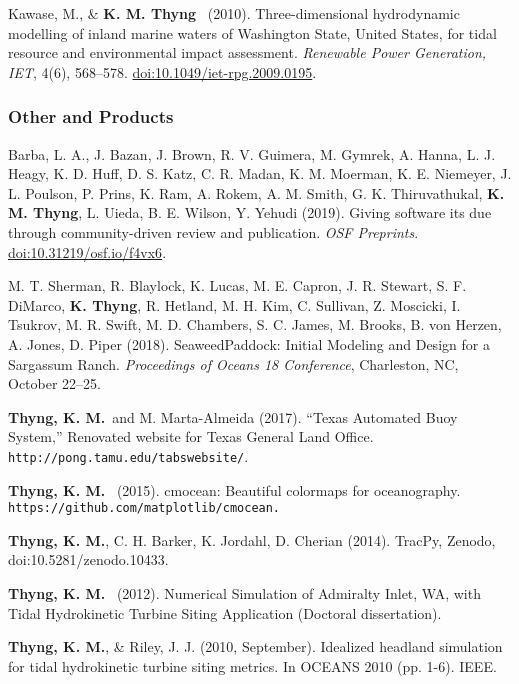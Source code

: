 \documentclass[10pt,letterpaper]{article}
\newcommand{\kmt}{\textbf{K. M. Thyng}}
\newcommand{\tkm}{\textbf{Thyng, K. M.}}
\newcommand{\kt}{\textbf{K. Thyng}}
\renewenvironment{itemize}{
  \begin{list}{}{
    \setlength{\leftmargin}{1.5em}
    \setlength{\itemsep}{0.25em}
    \setlength{\parskip}{0pt}
    \setlength{\parsep}{0.25em}
  }
}{
  \end{list}
}
\begin{document}
\begin{itemize}
\item Kawase, M., \& \kmt~ (2010). Three-dimensional hydrodynamic modelling of inland marine waters of Washington State, United States, for tidal resource and environmental impact assessment. \textit{Renewable Power Generation, IET}, 4(6), 568--578. \href{http://digital-library.theiet.org/content/journals/10.1049/iet-rpg.2009.0195}{doi:10.1049/iet-rpg.2009.0195}.

\end{itemize}

\subsubsection*{Other and Products}

\begin{itemize}

\item Barba, L. A., J. Bazan, J. Brown, R. V. Guimera, M. Gymrek, A. Hanna, L. J. Heagy, K. D. Huff, D. S. Katz, C. R. Madan, K. M. Moerman, K. E. Niemeyer, J. L. Poulson, P. Prins, K. Ram, A. Rokem, A. M. Smith, G. K. Thiruvathukal, \kmt, L. Uieda, B. E. Wilson, Y. Yehudi (2019). Giving software its due through community-driven review and publication. \textit{OSF Preprints}. \href{https://doi.org/10.31219/osf.io/f4vx6}{doi:10.31219/osf.io/f4vx6}.

\item M. T. Sherman, R. Blaylock, K. Lucas, M. E. Capron, J. R. Stewart, S. F. DiMarco, \kt, R. Hetland, M. H. Kim, C. Sullivan, Z. Moscicki, I. Tsukrov, M. R. Swift, M. D. Chambers, S. C. James, M. Brooks, B. von Herzen, A. Jones, D. Piper (2018). SeaweedPaddock: Initial Modeling and Design for a Sargassum Ranch. \textit{Proceedings of Oceans 18 Conference}, Charleston, NC, October 22--25.

\item \tkm~and M. Marta-Almeida (2017). ``Texas Automated Buoy System,'' Renovated website for Texas General Land Office. \verb+http://pong.tamu.edu/tabswebsite/+.

\item \tkm~ (2015). cmocean: Beautiful colormaps for oceanography. \\ \verb+https://github.com/matplotlib/cmocean.+

\item \tkm, C. H. Barker, K. Jordahl, D. Cherian (2014). TracPy, Zenodo, doi:10.5281/zenodo.10433.

\item \tkm~ (2012). Numerical Simulation of Admiralty Inlet, WA, with Tidal Hydrokinetic Turbine Siting Application (Doctoral dissertation).

\item \tkm, \& Riley, J. J. (2010, September). Idealized headland simulation for tidal hydrokinetic turbine siting metrics. In OCEANS 2010 (pp. 1-6). IEEE.

\end{itemize}
\end{document}
